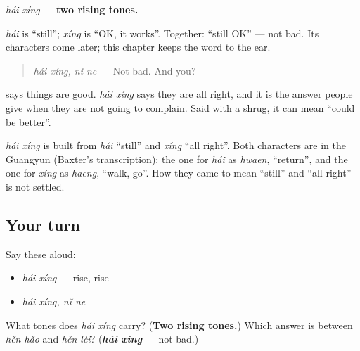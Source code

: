 \begin{sounds}
\emph{hái xíng} — \textbf{two rising tones.}

\emph{hái} is \textquotedblleft{}still\textquotedblright{}; \emph{xíng} is \textquotedblleft{}OK, it works\textquotedblright{}. Together: \textquotedblleft{}still OK\textquotedblright{} — not bad. Its characters come later; this chapter keeps the word to the ear.

\begin{quote}
\emph{hái xíng, nǐ ne} — Not bad. And you?
\end{quote}
\end{sounds}

\begin{culture}
 says things are good. \emph{hái xíng} says they are all right, and it is the answer people give when they are not going to complain. Said with a shrug, it can mean \textquotedblleft{}could be better\textquotedblright{}.
\end{culture}

\begin{cousinweb}
\emph{hái xíng} is built from \emph{hái} \textquotedblleft{}still\textquotedblright{} and \emph{xíng} \textquotedblleft{}all right\textquotedblright{}. Both characters are in the Guangyun (Baxter's transcription): the one for \emph{hái} as \emph{hwaen}, \textquotedblleft{}return\textquotedblright{}, and the one for \emph{xíng} as \emph{haeng}, \textquotedblleft{}walk, go\textquotedblright{}. How they came to mean \textquotedblleft{}still\textquotedblright{} and \textquotedblleft{}all right\textquotedblright{} is not settled.
\end{cousinweb}

\subsection*{Your turn}
Say these aloud:

\begin{itemize}
\raggedright
  \item \emph{hái xíng} — rise, rise
  \item \emph{hái xíng, nǐ ne}
\end{itemize}

\begin{tcolorbox}[breakable,colback=teal!4,colframe=teal!35!black,title={Before you move on}]
What tones does \emph{hái xíng} carry? (\textbf{Two rising tones.}) Which answer is between \emph{hěn hǎo} and \emph{hěn lèi}? (\emph{\textbf{hái xíng}} — not bad.)
\end{tcolorbox}
